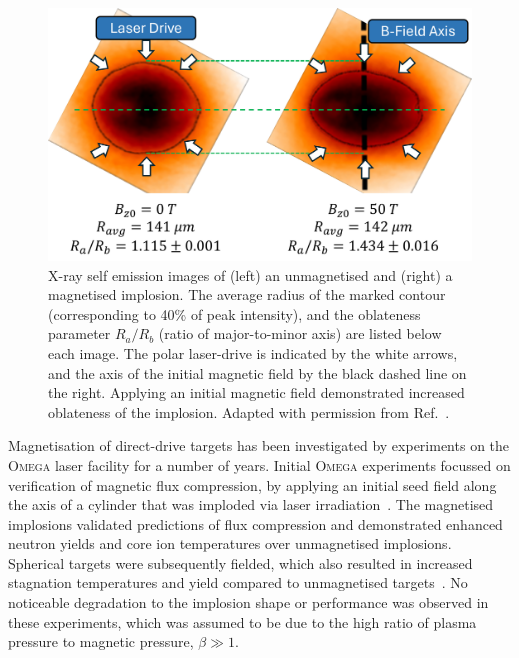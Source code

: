 \begin{figure}[t!]
    \includegraphics[width=0.6\linewidth]{Results2/Images/MagP2_Bose.png}
    \centering
    \caption{X-ray self emission images of (left) an unmagnetised and (right) a magnetised implosion.
    The average radius of the marked contour (corresponding to 40\% of peak intensity), and the oblateness parameter $R_a/R_b$ (ratio of major-to-minor axis) are listed below each image.
    The polar laser-drive is indicated by the white arrows, and the axis of the initial magnetic field by the black dashed line on the right.
    Applying an initial magnetic field demonstrated increased oblateness of the implosion.
    Adapted with permission from Ref.~\cite{bose_effect_2022}.}%
    \label{fig:Res2_Bose_magp2}
\end{figure}

Magnetisation of direct-drive targets has been investigated by experiments on the \textsc{Omega} laser facility for a number of years.
Initial \textsc{Omega} experiments focussed on verification of magnetic flux compression, by applying an initial seed field along the axis of a cylinder that was imploded via laser irradiation~\cite{gotchev_laser-driven_2009}.
The magnetised implosions validated predictions of flux compression and demonstrated enhanced neutron yields and core ion temperatures over unmagnetised implosions.
Spherical targets were subsequently fielded, which also resulted in increased stagnation temperatures and yield compared to unmagnetised targets~\cite{chang_fusion_2011,hohenberger_inertial_2012}.
No noticeable degradation to the implosion shape or performance was observed in these experiments, which was assumed to be due to the high ratio of plasma pressure to magnetic pressure, $\beta\gg 1$.

